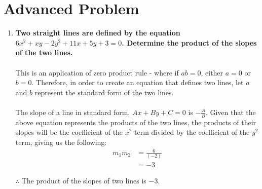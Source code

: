 \documentclass[12pt]{article}
\begin{document}
\section*{Advanced Problem}
\begin{enumerate}
    \item \textbf{Two straight lines are defined by the equation $6x^2 + xy - 2y^2 + 11x + 5y + 3 = 0$. Determine the product of the slopes of the two lines.} \\ \\
    This is an application of zero product rule - where if $ab = 0$, either $a = 0$ or $b = 0$. Therefore, in order to create an equation that defines two lines, let $a$ and $b$ represent the standard form of the two lines. \\ \\
    The slope of a line in standard form, $Ax + By + C = 0$ is $-\frac{A}{B}$. Given that the above equation represents the products of the two lines, the products of their slopes will be the coefficient of the $x^2$ term divided by the coefficient of the $y^2$ term, giving us the following:
    \begin{align*}
        m_1m_2 &= \frac{6}{(-2)} \\
        &= -3
    \end{align*}

    $\therefore$ The product of the slopes of two lines is $-3$.
\end{enumerate}
\end{document}
